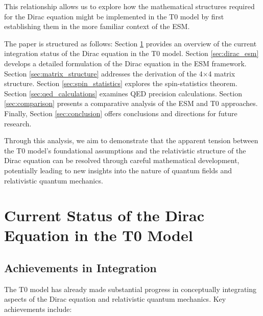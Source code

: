 \documentclass[12pt,a4paper]{article}
\begin{document}
	This relationship allows us to explore how the mathematical structures required for the Dirac equation might be implemented in the T0 model by first establishing them in the more familiar context of the ESM.
	
	The paper is structured as follows: Section \ref{sec:current_status} provides an overview of the current integration status of the Dirac equation in the T0 model. Section \ref{sec:dirac_esm} develops a detailed formulation of the Dirac equation in the ESM framework. Section \ref{sec:matrix_structure} addresses the derivation of the 4$\times$4 matrix structure. Section \ref{sec:spin_statistics} explores the spin-statistics theorem. Section \ref{sec:qed_calculations} examines QED precision calculations. Section \ref{sec:comparison} presents a comparative analysis of the ESM and T0 approaches. Finally, Section \ref{sec:conclusion} offers conclusions and directions for future research.
	
	Through this analysis, we aim to demonstrate that the apparent tension between the T0 model's foundational assumptions and the relativistic structure of the Dirac equation can be resolved through careful mathematical development, potentially leading to new insights into the nature of quantum fields and relativistic quantum mechanics.
	
	\section{Current Status of the Dirac Equation in the T0 Model}
	\label{sec:current_status}
	
	\subsection{Achievements in Integration}
	\label{subsec:achievements}
	
	The T0 model has already made substantial progress in conceptually integrating aspects of the Dirac equation and relativistic quantum mechanics. Key achievements include:
	
\end{document}
